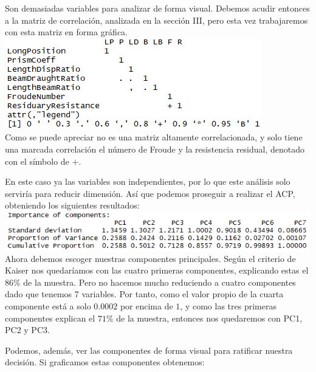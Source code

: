 \documentclass[twoside]{article}
\begin{document}
\begin{multicols}{2}
Son demasiadas variables para analizar de forma visual. Debemos acudir entonces a la matriz de correlaci\'on, analizada en la secci\'on III, pero esta vez trabajaremos con esta matriz en forma gr\'afica.\\

\includegraphics[scale = 0.5]{images/pic_22.png} \\

Como se puede apreciar no es una matriz altamente correlacionada, y solo tiene una marcada correlaci\'on el n\'umero de Froude y la resistencia residual, denotado con el s\'imbolo de $+$. 

En este caso ya las variables son independientes, por lo que este an\'alisis solo servir\'ia para reducir dimensi\'on. As\'i que podemos proseguir a realizar el ACP, obteniendo los siguientes resultados:\\

\includegraphics[scale = 0.4]{images/pic_23.png} \\

Ahora debemos escoger nuestras componentes principales. Seg\'un el criterio de Kaiser nos quedar\'iamos con las cuatro primeras componentes, explicando estas el $86\%$ de la muestra. Pero no hacemos mucho reduciendo a cuatro componentes dado que tenemos 7 variables. Por tanto, como el valor propio de la cuarta componente est\'a a solo $0.0002$ por encima de $1$, y como las tres primeras componentes explican el $71\%$ de la muestra, entonces nos quedaremos con PC1, PC2 y PC3.

Podemos, adem\'as, ver las componentes de forma visual para ratificar nuestra decisi\'on. Si graficamos estas componentes obtenemos:\\


\end{multicols}
\end{document}
